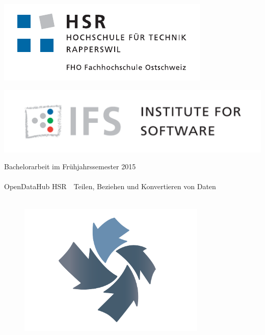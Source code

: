 
\author{
	\rlif \\
	\and
	\chuf \\
	\and
	\fscf \\
}

\clearpage
\begin{titlepage}
	\begin{minipage}{0.4\textwidth}
		\includegraphics[width=\textwidth]{fig/hsr-logo}
	\end{minipage}
	\hfill
	\begin{minipage}[b]{0.4\textwidth}
		\includegraphics[width=\textwidth]{fig/ifs-logo}
	\end{minipage}

	\begin{center}
		\Large{Bachelorarbeit im Frühjahrssemester 2015} \\ [25pt]
		\hr{1pt} \\[0.2cm]
		\huge OpenDataHub HSR\ \textendash \ Teilen, Beziehen und Konvertieren von Daten \\
		\hr{1pt} \\[0.2cm]
		
		\begin{figure}[H]
			\centering
			\includegraphics[width=0.8\textwidth]{fig/logo-odh}
		\end{figure}
		\vfill
	\end{center}
	

\end{titlepage}
